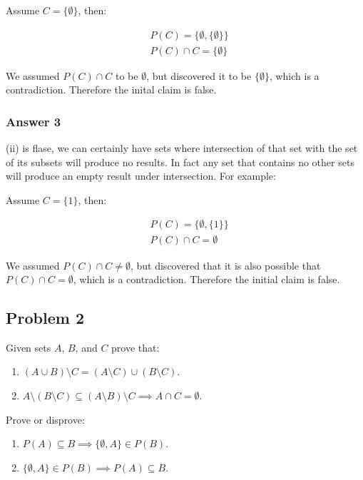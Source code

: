 \documentclass[11pt]{article}
\begin{document}
Assume $C = \{\emptyset\}$, then:

\begin{equation}
\begin{split}
& P(C) = \{\emptyset, \{\emptyset\}\} \\
& P(C) \cap C = \{\emptyset\}
\end{split}
\end{equation}

We assumed $P(C) \cap C$ to be $\emptyset$, but discovered it to be
$\{\emptyset\}$, which is a contradiction.  Therefore the inital claim is
false.
\subsubsection{Answer 3}
\label{sec-1-1-3}
(ii) is flase, we can certainly have sets where intersection of that set with
the set of its subsets will produce no results.  In fact any set that contains
no other sets will produce an empty result under intersection.  For example:

Assume $C = \{1\}$, then:

\begin{equation}
\begin{split}
& P(C) = \{\emptyset, \{1\}\} \\
& P(C) \cap C = \emptyset
\end{split}
\end{equation}

We assumed $P(C) \cap C \neq \emptyset$, but discovered that it is also
possible that $P(C) \cap C = \emptyset$, which is a contradiction.
Therefore the initial claim is false.

\subsection{Problem 2}
\label{sec-1-2}
Given sets $A$, $B$, and $C$ prove that:

\begin{enumerate}
\item $(A \cup B) \setminus C = (A \setminus C) \cup (B \setminus C)$.
\item $A \setminus (B \setminus C) \subseteq (A \setminus B) \setminus C \implies A \cap C = \emptyset$.
\end{enumerate}

Prove or disprove:

\begin{enumerate}
\item $P(A) \subseteq B \implies \{\emptyset, A\} \in P(B)$.
\item $\{\emptyset, A\} \in P(B) \implies P(A) \subseteq B$.
\end{enumerate}
\end{document}
